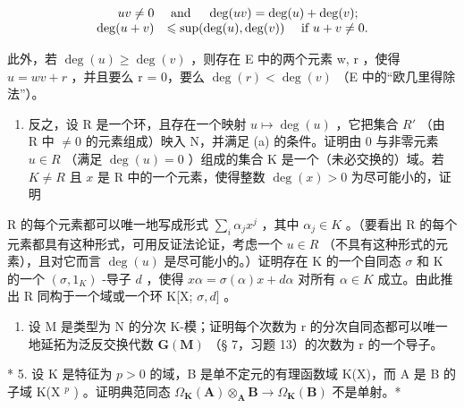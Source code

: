 \[
\begin{array}{r l} u v \neq 0 & \text { and } \quad \deg (u v) = \deg (u) + \deg (v); \\ \deg (u + v) & \leqslant \sup (\deg (u), \deg (v)) \quad \text { if } u + v \neq 0. \end{array}
\]

此外，若 \(\deg(u) \geqslant \deg(v)\) ，则存在 E 中的两个元素 w, r ，使得 \(u = wv + r\) ，并且要么 r = 0，要么 \(\deg(r) < \deg(v)\) （E 中的“欧几里得除法”）。

\begin{enumerate}
\def\labelenumi{(\alph{enumi})}
\setcounter{enumi}{1}
\tightlist
\item
  反之，设 R 是一个环，且存在一个映射 \(u \mapsto \deg(u)\) ，它把集合 \(R'\) （由 R 中 \(\neq 0\) 的元素组成）映入 N，并满足 (a) 的条件。证明由 0 与非零元素 \(u \in R\) （满足 \(\deg(u) = 0\) ）组成的集合 K 是一个（未必交换的）域。若 \(K \neq R\) 且 \(x\) 是 R 中的一个元素，使得整数 \(\deg(x) > 0\) 为尽可能小的，证明
\end{enumerate}

R 的每个元素都可以唯一地写成形式 \(\sum_{i} \alpha_j x^j\) ，其中 \(\alpha_j \in K\) 。（要看出 R 的每个元素都具有这种形式，可用反证法论证，考虑一个 \(u \in R\) （不具有这种形式的元素），且对它而言 \(\deg(u)\) 是尽可能小的。）证明存在 K 的一个自同态 \(\sigma\) 和 K 的一个 \((\sigma, 1_K)\) -导子 \(d\) ，使得 \(x\alpha = \sigma(\alpha)x + d\alpha\) 对所有 \(\alpha \in K\) 成立。由此推出 R 同构于一个域或一个环 K{[}X; \(\sigma, d]\) 。

\begin{enumerate}
\def\labelenumi{\arabic{enumi}.}
\setcounter{enumi}{3}
\tightlist
\item
  设 M 是类型为 N 的分次 K-模；证明每个次数为 r 的分次自同态都可以唯一地延拓为泛反交换代数 \(\mathbf{G}(\mathbf{M})\) （§ 7，习题 13）的次数为 r 的一个导子。
\end{enumerate}

* 5. 设 K 是特征为 \(p > 0\) 的域，B 是单不定元的有理函数域 K(X)，而 A 是 B 的子域 K(X \(^{p}\) ) 。证明典范同态 \(\Omega_{\mathbf{K}}(\mathbf{A}) \otimes_{\mathbf{A}} \mathbf{B} \to \Omega_{\mathbf{K}}(\mathbf{B})\) 不是单射。*

